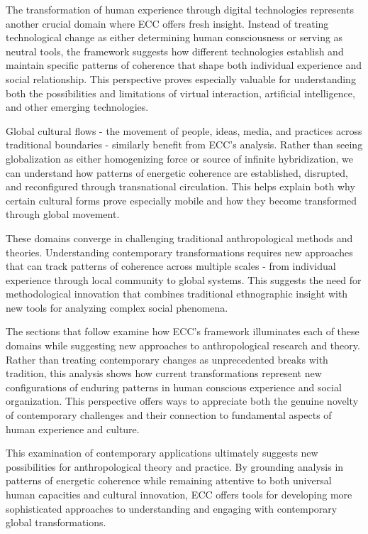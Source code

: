 \begin{refsection}
The transformation of human experience through digital technologies represents another crucial domain where ECC offers fresh insight. Instead of treating technological change as either determining human consciousness or serving as neutral tools, the framework suggests how different technologies establish and maintain specific patterns of coherence that shape both individual experience and social relationship. This perspective proves especially valuable for understanding both the possibilities and limitations of virtual interaction, artificial intelligence, and other emerging technologies.

Global cultural flows - the movement of people, ideas, media, and practices across traditional boundaries - similarly benefit from ECC's analysis. Rather than seeing globalization as either homogenizing force or source of infinite hybridization, we can understand how patterns of energetic coherence are established, disrupted, and reconfigured through transnational circulation. This helps explain both why certain cultural forms prove especially mobile and how they become transformed through global movement.

These domains converge in challenging traditional anthropological methods and theories. Understanding contemporary transformations requires new approaches that can track patterns of coherence across multiple scales - from individual experience through local community to global systems. This suggests the need for methodological innovation that combines traditional ethnographic insight with new tools for analyzing complex social phenomena.

The sections that follow examine how ECC's framework illuminates each of these domains while suggesting new approaches to anthropological research and theory. Rather than treating contemporary changes as unprecedented breaks with tradition, this analysis shows how current transformations represent new configurations of enduring patterns in human conscious experience and social organization. This perspective offers ways to appreciate both the genuine novelty of contemporary challenges and their connection to fundamental aspects of human experience and culture.

This examination of contemporary applications ultimately suggests new possibilities for anthropological theory and practice. By grounding analysis in patterns of energetic coherence while remaining attentive to both universal human capacities and cultural innovation, ECC offers tools for developing more sophisticated approaches to understanding and engaging with contemporary global transformations.


\end{refsection}
